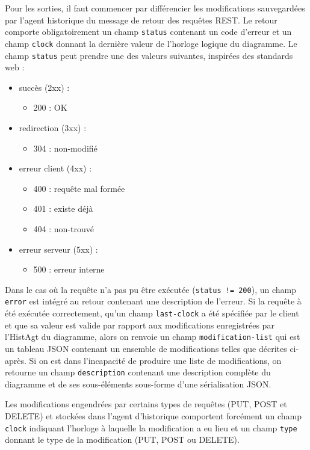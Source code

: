 Pour les sorties, il faut commencer par différencier les modifications sauvegardées par l'agent historique du message de retour des requêtes REST.
Le retour comporte obligatoirement un champ \lstinline$status$ contenant un code d'erreur et un champ \lstinline$clock$ donnant la dernière valeur de l'horloge logique du diagramme.
Le champ \lstinline$status$ peut prendre une des valeurs suivantes, inspirées des standards web :
\begin{itemize}
	\item succès (2xx) :
	\begin{itemize}
		\item 200 : OK
	\end{itemize}
	\item redirection (3xx) :
	\begin{itemize}
		\item 304 : non-modifié
	\end{itemize}
	\item erreur client (4xx) :
	\begin{itemize}
		\item 400 : requête mal formée
		\item 401 : existe déjà
		\item 404 : non-trouvé
	\end{itemize}
	\item erreur serveur (5xx) :
	\begin{itemize}
		\item 500 : erreur interne
	\end{itemize}
\end{itemize}
Dans le cas où la requête n'a pas pu être exécutée (\lstinline$status != 200$), un champ \lstinline$error$ est intégré au retour contenant une description de l'erreur.
Si la requête à été exécutée correctement, qu'un champ \lstinline$last-clock$ a été spécifiée par le client et que sa valeur est valide par rapport aux modifications enregistrées par l'HistAgt du diagramme, alors on renvoie un champ \lstinline$modification-list$ qui est un tableau JSON contenant un ensemble de modifications telles que décrites ci-après.
Si on est dans l'incapacité de produire une liste de modifications, on retourne un champ \lstinline$description$ contenant une description complète du diagramme et de ses sous-éléments sous-forme d'une sérialisation JSON.

Les modifications engendrées par certains types de requêtes (PUT, POST et DELETE) et stockées dans l'agent d'historique comportent forcément un champ \lstinline$clock$ indiquant l'horloge à laquelle la modification a eu lieu et un champ \lstinline$type$ donnant le type de la modification (PUT, POST ou DELETE).

